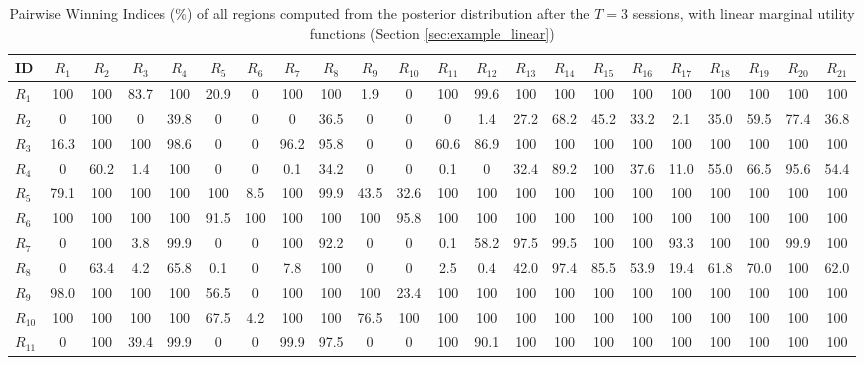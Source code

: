 \begin{table}[h!]
\centering
\footnotesize
\caption{Pairwise Winning Indices (\%) of all regions computed from the posterior distribution after the $T=3$ sessions, with linear marginal utility functions (Section \ref{sec:example_linear})}
\label{tab:PWI_lin_t3}
\begin{tabularx}{\textwidth}{X|CCCCCCCCCCCCCCCCCCCCC}
\toprule
ID&$R_{1}$&$R_{2}$&$R_{3}$&$R_{4}$&$R_{5}$&$R_{6}$&$R_{7}$&$R_{8}$&$R_{9}$&$R_{10}$&$R_{11}$&$R_{12}$&$R_{13}$&$R_{14}$&$R_{15}$&$R_{16}$&$R_{17}$&$R_{18}$&$R_{19}$&$R_{20}$&$R_{21}$\\
\midrule
$R_{1}$ & 100 & 100 & 83.7 & 100 & 20.9 & 0 & 100 & 100 & 1.9 & 0 & 100 & 99.6 & 100 & 100 & 100 & 100 & 100 & 100 & 100 & 100 & 100 \\
$R_{2}$ & 0 & 100 & 0 & 39.8 & 0 & 0 & 0 & 36.5 & 0 & 0 & 0 & 1.4 & 27.2 & 68.2 & 45.2 & 33.2 & 2.1 & 35.0 & 59.5 & 77.4 & 36.8 \\
$R_{3}$ & 16.3 & 100 & 100 & 98.6 & 0 & 0 & 96.2 & 95.8 & 0 & 0 & 60.6 & 86.9 & 100 & 100 & 100 & 100 & 100 & 100 & 100 & 100 & 100 \\
$R_{4}$ & 0 & 60.2 & 1.4 & 100 & 0 & 0 & 0.1 & 34.2 & 0 & 0 & 0.1 & 0 & 32.4 & 89.2 & 100 & 37.6 & 11.0 & 55.0 & 66.5 & 95.6 & 54.4 \\
$R_{5}$ & 79.1 & 100 & 100 & 100 & 100 & 8.5 & 100 & 99.9 & 43.5 & 32.6 & 100 & 100 & 100 & 100 & 100 & 100 & 100 & 100 & 100 & 100 & 100 \\
$R_{6}$ & 100 & 100 & 100 & 100 & 91.5 & 100 & 100 & 100 & 100 & 95.8 & 100 & 100 & 100 & 100 & 100 & 100 & 100 & 100 & 100 & 100 & 100 \\
$R_{7}$ & 0 & 100 & 3.8 & 99.9 & 0 & 0 & 100 & 92.2 & 0 & 0 & 0.1 & 58.2 & 97.5 & 99.5 & 100 & 100 & 93.3 & 100 & 100 & 99.9 & 100 \\
$R_{8}$ & 0 & 63.4 & 4.2 & 65.8 & 0.1 & 0 & 7.8 & 100 & 0 & 0 & 2.5 & 0.4 & 42.0 & 97.4 & 85.5 & 53.9 & 19.4 & 61.8 & 70.0 & 100 & 62.0 \\
$R_{9}$ & 98.0 & 100 & 100 & 100 & 56.5 & 0 & 100 & 100 & 100 & 23.4 & 100 & 100 & 100 & 100 & 100 & 100 & 100 & 100 & 100 & 100 & 100 \\
$R_{10}$ & 100 & 100 & 100 & 100 & 67.5 & 4.2 & 100 & 100 & 76.5 & 100 & 100 & 100 & 100 & 100 & 100 & 100 & 100 & 100 & 100 & 100 & 100 \\
$R_{11}$ & 0 & 100 & 39.4 & 99.9 & 0 & 0 & 99.9 & 97.5 & 0 & 0 & 100 & 90.1 & 100 & 100 & 100 & 100 & 100 & 100 & 100 & 100 & 100 \\

\end{tabularx}
\end{table}
